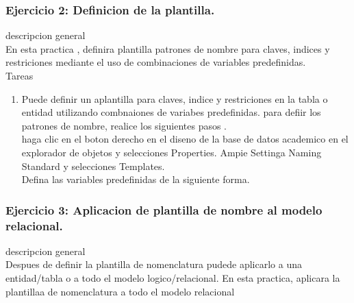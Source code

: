 \documentclass[12pt,letterpaper]{article}
\begin{document}
		\subsubsection{Ejercicio 2: Definicion de la plantilla.}
		descripcion general  \\
En esta practica , definira plantilla patrones de nombre para claves, indices y restriciones mediante el uso de combinaciones de variables predefinidas. \\

Tareas
\begin{enumerate}[1.]
    \item Puede definir un aplantilla para claves, indice y restriciones en la tabla o entidad utilizando combnaiones de variabes predefinidas. para defiir los patrones de nombre, realice los siguientes pasos .  \\
haga clic en el boton derecho en el diseno de la base de datos academico en el explorador de objetos y selecciones Properties. Ampie Settinga Naming Standard y selecciones Templates. \\
 Defina las variables predefinidas de la siguiente forma. 
    
		\end{enumerate}
		\subsubsection{Ejercicio 3: Aplicacion de plantilla de nombre al modelo relacional.}
		descripcion general  \\
Despues de definir la plantilla de nomenclatura pudede aplicarlo a una entidad/tabla o a todo el modelo logico/relacional. En esta practica, aplicara la plantillaa de nomenclatura a todo el modelo relacional \\
\end{document}
